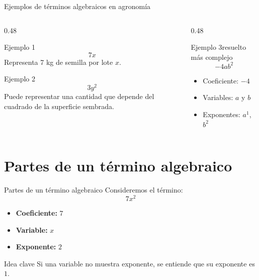 \documentclass[handout,aspectratio=169,12pt]{beamer}
\newcommand{\IdeaClave}[1]{
	\begin{alertblock}{Idea clave}
		#1
	\end{alertblock}
}
\begin{document}
	\begin{frame}{Ejemplos de términos algebraicos en agronomía}
		\begin{columns}[T]
			\begin{column}{0.48\textwidth}
				\begin{block}{Ejemplo 1}
					\[
					7x
					\]
					\pause
					Representa 7 kg de semilla por lote \(x\).
				\end{block}
				
				\pause
				\begin{block}{Ejemplo 2}
					\[
					3y^2
					\]
					\pause
					Puede representar una cantidad que depende del cuadrado de la superficie sembrada.
				\end{block}
			\end{column}
			
			\begin{column}{0.48\textwidth}
				\begin{exampleblock}{Ejemplo 3resuelto más complejo}
					\[
					-4ab^2
					\]
					\pause
					\begin{itemize}
						\item Coeficiente: \(-4\)
						\pause
						\item Variables: \(a\) y \(b\)
						\pause
						\item Exponentes: \(a^1\), \(b^2\)
					\end{itemize}
				\end{exampleblock}
			\end{column}
		\end{columns}
	\end{frame}
	
	\section{Partes de un término algebraico}
	\begin{frame}{Partes de un término algebraico}
		Consideremos el término:
		\[
		7x^2
		\]
		
		\pause
		\begin{itemize}
			\item \textbf{Coeficiente:} \(7\)
			\pause
			\item \textbf{Variable:} \(x\)
			\pause
			\item \textbf{Exponente:} \(2\)
		\end{itemize}
		
		\pause
		\IdeaClave{Si una variable no muestra exponente, se entiende que su exponente es \(1\).}
	\end{frame}
	
\end{document}
